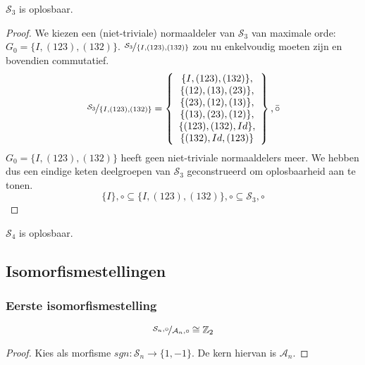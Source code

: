\documentclass[main.tex]{subfiles}
\begin{document}
\begin{vb}
  $\mathcal{S}_{3}$ is oplosbaar.

  \begin{proof}
    We kiezen een (niet-triviale) normaaldeler van $\mathcal{S}_{3}$ van maximale orde: $G_{0}=\{I,(123),(132)\}$.
    $\nicefrac{\mathcal{S}_{3}}{\{I,(123),(132)\}}$ zou nu enkelvoudig moeten zijn en bovendien commutatief.
    \[
    \nicefrac{\mathcal{S}_{3}}{\{I,(123),(132)\}} =
    \left\{
      \begin{array}{c}
        \{I,(123),(132)\},\\ 
        \{(12), (13), (23)\},\\
        \{ (23), (12), (13)\},\\
        \{ (13), (23), (12)\},\\
        \{ (123), (132), Id\},\\
        \{ (132), Id, (123)\}
      \end{array}
    \right\},\bar{\circ}
    \]
    $G_{0}=\{I,(123),(132)\}$ heeft geen niet-triviale normaaldelers meer.
    We hebben dus een eindige keten deelgroepen van $\mathcal{S}_{3}$ geconstrueerd om oplosbaarheid aan te tonen.
    \[ \{ I\},\circ \subseteq \{I,(123),(132)\},\circ \subseteq \mathcal{S}_{3},\circ \]
  \end{proof}
\end{vb}

\begin{vb}
  $\mathcal{S}_{4}$ is oplosbaar.
\end{vb}

\subsection{Isomorfismestellingen}

\subsubsection{Eerste isomorfismestelling}

\begin{vb}
  \[ \nicefrac{\mathcal{S}_{n},\circ}{\mathcal{A}_{n},\circ} \cong \mathbb{Z}_{2} \]
  
  \begin{proof}
    Kies als morfisme $sgn: \mathcal{S}_{n} \rightarrow \{ 1,-1 \}$.
    De kern hiervan is $\mathcal{A}_{n}$.
  \end{proof}
\end{vb}
\end{document}
